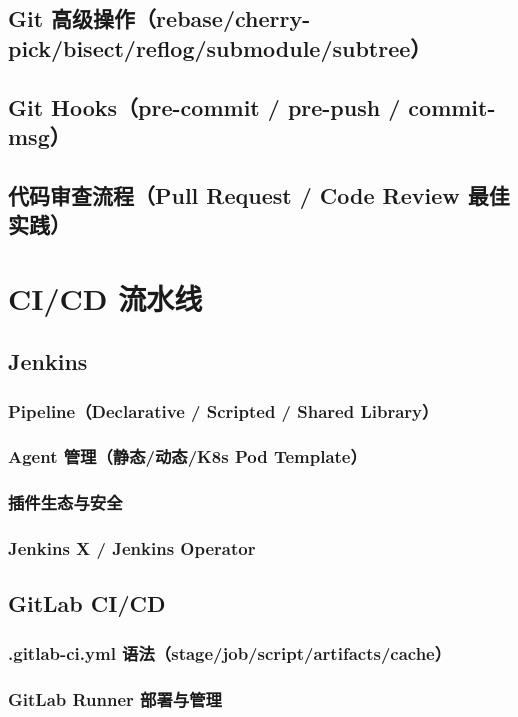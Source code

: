 \documentclass[12pt,UTF8]{ctexbook}
\begin{document}
  \section{Git 高级操作（rebase/cherry-pick/bisect/reflog/submodule/subtree）}
  \section{Git Hooks（pre-commit / pre-push / commit-msg）}
  \section{代码审查流程（Pull Request / Code Review 最佳实践）}

\chapter{CI/CD 流水线}
\label{chap:cicd}

  \section{Jenkins}
    \subsection{Pipeline（Declarative / Scripted / Shared Library）}
    \subsection{Agent 管理（静态/动态/K8s Pod Template）}
    \subsection{插件生态与安全}
    \subsection{Jenkins X / Jenkins Operator}

  \section{GitLab CI/CD}
    \subsection{.gitlab-ci.yml 语法（stage/job/script/artifacts/cache）}
    \subsection{GitLab Runner 部署与管理}
\end{document}
